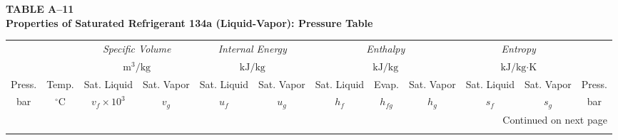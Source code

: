 \documentclass[12pt,a3paper]{article}
\begin{document}
\begin{enumerate}
\noindent\textbf{\Large TABLE A--11} \\
\noindent\textbf{\large Properties of Saturated Refrigerant 134a (Liquid-Vapor): Pressure Table}
\vspace{0.3cm}

\begin{center}
\small
\begin{longtable}{c c c c c c c c c c c c}
\toprule\toprule
& & \multicolumn{2}{c}{\textit{Specific Volume}} & \multicolumn{2}{c}{\textit{Internal Energy}} & \multicolumn{3}{c}{\textit{Enthalpy}} & \multicolumn{2}{c}{\textit{Entropy}} & \\
& & \multicolumn{2}{c}{$\text{m}^3\text{/kg}$} & \multicolumn{2}{c}{$\text{kJ/kg}$} & \multicolumn{3}{c}{$\text{kJ/kg}$} & \multicolumn{2}{c}{$\text{kJ/kg}\cdot\text{K}$} & \\
\cmidrule(lr){3-4} \cmidrule(lr){5-6} \cmidrule(lr){7-9} \cmidrule(lr){10-11}
Press. & Temp. & Sat. Liquid & Sat. Vapor & Sat. Liquid & Sat. Vapor & Sat. Liquid & Evap. & Sat. Vapor & Sat. Liquid & Sat. Vapor & Press. \\
bar & $^\circ\text{C}$ & $v_f \times 10^3$ & $v_g$ & $u_f$ & $u_g$ & $h_f$ & $h_{fg}$ & $h_g$ & $s_f$ & $s_g$ & bar \\
\midrule
\endhead

\midrule
\multicolumn{12}{r}{{Continued on next page}} \\
\bottomrule
\endfoot

\bottomrule\bottomrule
\endlastfoot


\end{longtable}
\end{center}
\end{enumerate}
\end{document}
